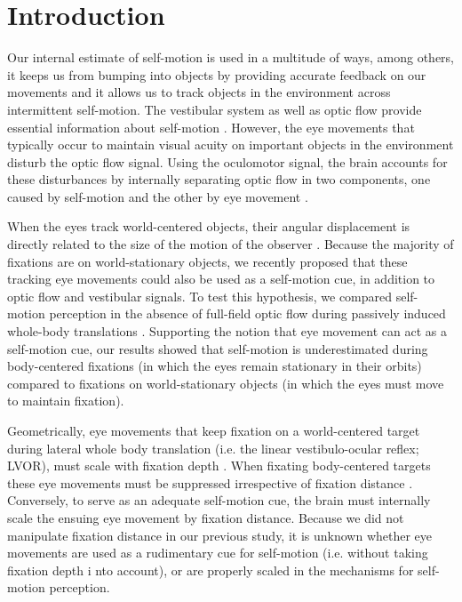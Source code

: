 \section{Introduction}

Our internal estimate of self-motion is used in a multitude of ways, among others, it keeps us from bumping into objects by providing accurate feedback on our movements and it allows us to track objects in the environment across intermittent self-motion. The vestibular system as well as optic flow provide essential information about self-motion \cite{gibson1955, benson1986, harris2000, israel1989, angelaki2005, carriot2013, chen2010}. However, the eye movements that typically occur to maintain visual acuity on important objects in the environment disturb the optic flow signal. Using the oculomotor signal, the brain accounts for these disturbances by internally separating optic flow in two components, one caused by self-motion and the other by eye movement  \cite{warren1988, royden1992, freeman1998, lappe1999}.

When the eyes track world-centered objects, their angular displacement is directly related to the size of the motion of the observer \cite{schwarz1989, paige1988, mchenry2000, medendorp2002}. Because  the majority of fixations are on world-stationary  objects, we recently proposed that these tracking eye movements could also be used as a self-motion cue, in addition to optic flow and vestibular signals. To test this hypothesis, we compared self-motion perception in the absence of full-field optic flow during passively induced whole-body translations \cite{clemens2015a}. Supporting the notion that eye movement can act as a self-motion cue, our results showed that self-motion is underestimated during body-centered fixations (in which the eyes remain stationary in their orbits) compared to fixations on world-stationary objects (in which the eyes must move to maintain fixation).

Geometrically, eye movements that keep fixation on a world-centered target during lateral whole body translation (i.e. the linear vestibulo-ocular reflex; LVOR), must scale with fixation depth \cite{angelaki2004}. When fixating body-centered targets these eye movements must be suppressed irrespective of fixation distance \cite{angelaki2004}. Conversely, to serve as an adequate self-motion cue, the brain must internally scale the ensuing eye movement by fixation distance. Because we did not manipulate fixation distance in our previous study, it is unknown whether eye movements are used as a rudimentary cue for self-motion (i.e. without taking fixation depth i nto account), or are properly scaled in the mechanisms for self-motion perception.

